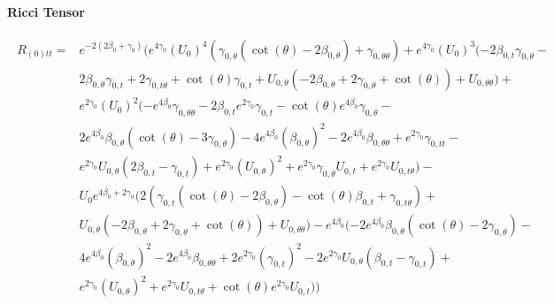 \documentclass[a4paper,11pt]{article}
\numberwithin{equation}{section}
\begin{document}
\noindent \textbf{Ricci Tensor}

\begin{subequations}

\begin{align}
\begin{split}
R_{(0)tt}= &e^{-2 (2 \beta_{0}+\gamma_{0})} (e^{4 \gamma_{0}} (U_{0})^4 (\gamma_{0, \theta} (\cot (\theta )-2 \beta_{0, \theta})+\gamma_{0, \theta \theta})+e^{4 \gamma_{0}} (U_{0})^3 (-2 \beta_{0, t} \gamma_{0, \theta}-\\
&2 \beta_{0, \theta} \gamma_{0, t}+2 \gamma_{0, t \theta}+\cot (\theta ) \gamma_{0, t}+U_{0, \theta} (-2 \beta_{0, \theta}+2 \gamma_{0, \theta}+\cot (\theta ))+U_{0, \theta \theta})+\\
&e^{2 \gamma_{0}} (U_{0})^2 (-e^{4 \beta_{0}} \gamma_{0, \theta \theta}-2 \beta_{0, t} e^{2 \gamma_{0}} \gamma_{0, t}-\cot (\theta ) e^{4 \beta_{0}} \gamma_{0, \theta}-\\
&2 e^{4 \beta_{0}} \beta_{0, \theta} (\cot (\theta )-3 \gamma_{0, \theta})-4 e^{4 \beta_{0}} (\beta_{0, \theta})^2-2 e^{4 \beta_{0}} \beta_{0, \theta \theta}+e^{2 \gamma_{0}} \gamma_{0, t t}-\\
&e^{2 \gamma_{0}} U_{0, \theta} (2 \beta_{0, t}-\gamma_{0, t})+e^{2 \gamma_{0}} (U_{0, \theta})^2+e^{2 \gamma_{0}} \gamma_{0, \theta} U_{0, t}+e^{2 \gamma_{0}} U_{0, t \theta})-\\
&U_{0} e^{4 \beta_{0}+2 \gamma_{0}} (2 (\gamma_{0, t} (\cot (\theta )-2 \beta_{0, \theta})-\cot (\theta ) \beta_{0, t}+\gamma_{0, t \theta})+\\
&U_{0, \theta} (-2 \beta_{0, \theta}+2 \gamma_{0, \theta}+\cot (\theta ))+U_{0, \theta \theta})-e^{4 \beta_{0}} (-2 e^{4 \beta_{0}} \beta_{0, \theta} (\cot (\theta )-2 \gamma_{0, \theta})-\\
&4 e^{4 \beta_{0}} (\beta_{0, \theta})^2-2 e^{4 \beta_{0}} \beta_{0, \theta \theta}+2 e^{2 \gamma_{0}} (\gamma_{0, t})^2-2 e^{2 \gamma_{0}} U_{0, \theta} (\beta_{0, t}-\gamma_{0, t})+\\
&e^{2 \gamma_{0}} (U_{0, \theta})^2+e^{2 \gamma_{0}} U_{0, t \theta}+\cot (\theta ) e^{2 \gamma_{0}} U_{0, t}))
\end{split}
\end{align}


\end{subequations}
\end{document}
